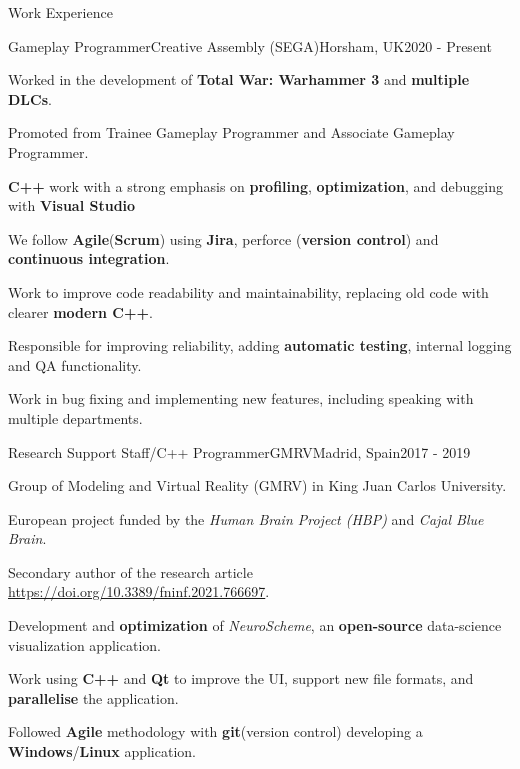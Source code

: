 \documentclass{resume} %
\begin{document}

\begin{mainSection}{Work Experience}
\begin{multiWorkExperience}
{Gameplay Programmer}{Creative Assembly (SEGA)}{Horsham, UK}{2020 - Present}

Worked in the development of \textbf{Total War: Warhammer 3} and \textbf{multiple DLCs}.

Promoted from Trainee Gameplay Programmer and Associate Gameplay Programmer.

\textbf{C++} work with a strong emphasis on \textbf{profiling}, \textbf{optimization}, and debugging with \textbf{Visual Studio}

We follow \textbf{Agile}(\textbf{Scrum}) using \textbf{Jira}, perforce (\textbf{version control}) and \textbf{continuous integration}. 

Work to improve code readability and maintainability, replacing old code with clearer \textbf{modern C++}.

Responsible for improving reliability, adding \textbf{automatic testing}, internal logging and QA functionality.

Work in bug fixing and implementing new features, including speaking with multiple departments.
\end{multiWorkExperience}
\begin{multiWorkExperience}
{Research Support Staff/C++ Programmer}{GMRV}{Madrid, Spain}{2017 - 2019}

Group of Modeling and Virtual Reality (GMRV) in King Juan Carlos University.

European project funded by the \textit{Human Brain Project (HBP)} and \textit{Cajal Blue Brain}.

Secondary author of the research article \url{https://doi.org/10.3389/fninf.2021.766697}.

Development and \textbf{optimization} of \textit{NeuroScheme}, an \textbf{open-source} data-science visualization application.

Work using \textbf{C++} and \textbf{Qt} to improve the UI, support new file formats, and \textbf{parallelise} the application.

Followed \textbf{Agile} methodology with \textbf{git}(version control) developing a \textbf{Windows}/\textbf{Linux} application.
\end{multiWorkExperience}
\end{mainSection}
\end{document}
